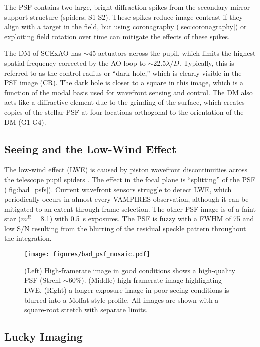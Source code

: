 The PSF contains two large, bright diffraction spikes from the secondary mirror support structure (spiders; S1-S2). These spikes reduce image contrast if they align with a target in the field, but using coronagraphy (\autoref{sec:coronagraphy}) or exploiting field rotation over time can mitigate the effects of these spikes.

The DM of SCExAO has $\sim$45 actuators across the pupil, which limits the highest spatial frequency corrected by the AO loop to $\sim$22.5$\lambda/D$. Typically, this is referred to as the control radius or ``dark hole,'' which is clearly visible in the PSF image (CR). The dark hole is closer to a square in this image, which is a function of the modal basis used for wavefront sensing and control. The DM also acts like a diffractive element due to the grinding of the surface, which creates copies of the stellar PSF at four locations orthogonal to the orientation of the DM (G1-G4).

\subsection{Seeing and the Low-Wind Effect}
The low-wind effect (LWE) is caused by piston wavefront discontinuities across the telescope pupil spiders  \citep{milli_low_2018}. The effect in the focal plane is ``splitting'' of the PSF (\autoref{fig:bad_psfs}). Current wavefront sensors struggle to detect LWE, which periodically occurs in almost every VAMPIRES observation, although it can be mitigated to an extent through frame selection. The other PSF image is of a faint star ($m^R=$8.1) with \SI{0.5}{\second} exposures. The PSF is fuzzy with a FWHM of \SI{75}{\mas} and low S/N resulting from the blurring of the residual speckle pattern throughout the integration.

\begin{figure}
    \centering
    \texttt{[image: figures/bad\_psf\_mosaic.pdf]}
    \caption{(Left) High-framerate image in good conditions shows a high-quality PSF (Strehl $\sim$60\%). (Middle) high-framerate image highlighting LWE. (Right) a longer exposure image in poor seeing conditions is blurred into a Moffat-style profile. All images are shown with a square-root stretch with separate limits.\label{fig:bad_psfs}}
\end{figure}

\subsection{Lucky Imaging}

